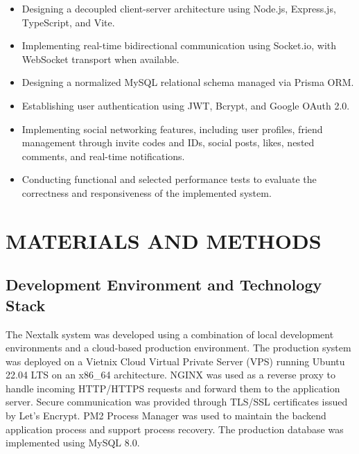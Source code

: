 \documentclass[12pt, a4paper]{article}
\begin{document}
\begin{itemize}
    \item Designing a decoupled client-server architecture using Node.js,
    Express.js, TypeScript, and Vite.

    \item Implementing real-time bidirectional communication using
    Socket.io, with WebSocket transport when available.

    \item Designing a normalized MySQL relational schema managed via
    Prisma ORM.

    \item Establishing user authentication using JWT, Bcrypt, and Google
    OAuth 2.0.

    \item Implementing social networking features, including user profiles,
    friend management through invite codes and IDs, social posts, likes,
    nested comments, and real-time notifications.

    \item Conducting functional and selected performance tests to evaluate
    the correctness and responsiveness of the implemented system.
\end{itemize}

\section{MATERIALS AND METHODS}

\subsection{Development Environment and Technology Stack}

The Nextalk system was developed using a combination of local development environments and a cloud-based production environment. The production system was deployed on a Vietnix Cloud Virtual Private Server (VPS) running Ubuntu 22.04 LTS on an x86\_64 architecture. NGINX was used as a reverse proxy to handle incoming HTTP/HTTPS requests and forward them to the application server. Secure communication was provided through TLS/SSL certificates issued by Let's Encrypt. PM2 Process Manager was used to maintain the backend application process and support process recovery. The production database was implemented using MySQL 8.0.
\end{document}
